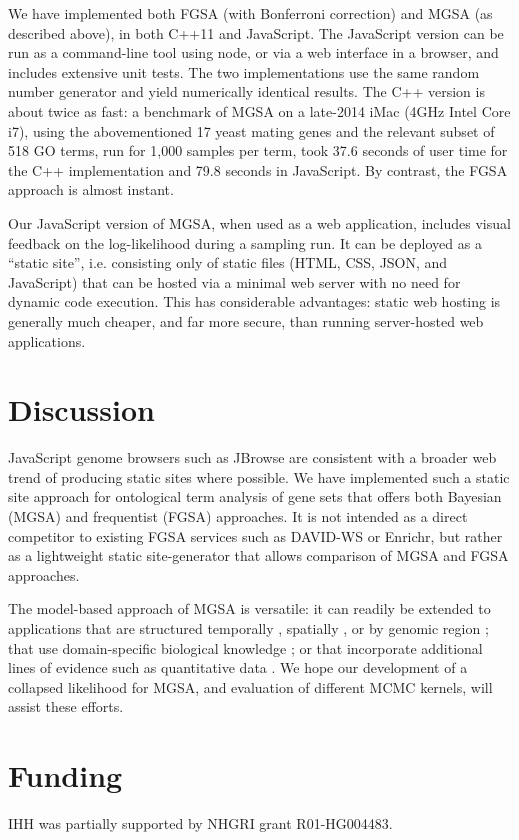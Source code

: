 We have implemented both FGSA (with Bonferroni correction) and MGSA (as described above), in both C++11 and JavaScript.
The JavaScript version can be run as a command-line tool using node, or via a web interface in a browser, and includes extensive unit tests.
The two implementations use the same random number generator and yield numerically identical results.
The C++ version is about twice as fast:
a benchmark of MGSA on a late-2014 iMac (4GHz Intel Core i7),
using the abovementioned 17 yeast mating genes and the relevant subset of 518 GO terms, run for 1,000 samples per term,
took 37.6 seconds of user time for the C++ implementation and 79.8 seconds in JavaScript.
By contrast, the FGSA approach is almost instant.

Our JavaScript version of MGSA, when used as a web application, includes visual feedback on the log-likelihood during a sampling run.
It can be deployed as a ``static site'',
i.e. consisting only of static files (HTML, CSS, JSON, and JavaScript) that can be hosted via a minimal web server with no need for dynamic code execution.
This has considerable advantages: static web hosting is generally much cheaper, and far more secure, than running server-hosted web applications.

\section*{Discussion}

JavaScript genome browsers such as JBrowse \citep{pmid27072794}
are consistent with a broader web trend of producing static sites where possible.
We have implemented such a static site approach for ontological term analysis of gene sets that offers both Bayesian (MGSA) and frequentist (FGSA) approaches.
It is not intended as a direct competitor to existing FGSA services such as DAVID-WS or Enrichr,
but rather as a lightweight static site-generator that allows comparison of MGSA and FGSA approaches.

The model-based approach of MGSA is versatile: it can readily be extended
to applications that are structured
temporally \citep{pmid26111374},
spatially \citep{pmid26877824},
or by genomic region \citep{pmid20436461};
that use domain-specific biological knowledge \citep{pmid24675718};
or that incorporate additional lines of evidence such as quantitative data \citep{pmid21599902}.
We hope our development of a collapsed likelihood for MGSA, and evaluation of different MCMC kernels, will assist these efforts.

\section*{Funding}

IHH was partially supported by NHGRI grant R01-HG004483.


%
%
%
%
%
%
%
%



